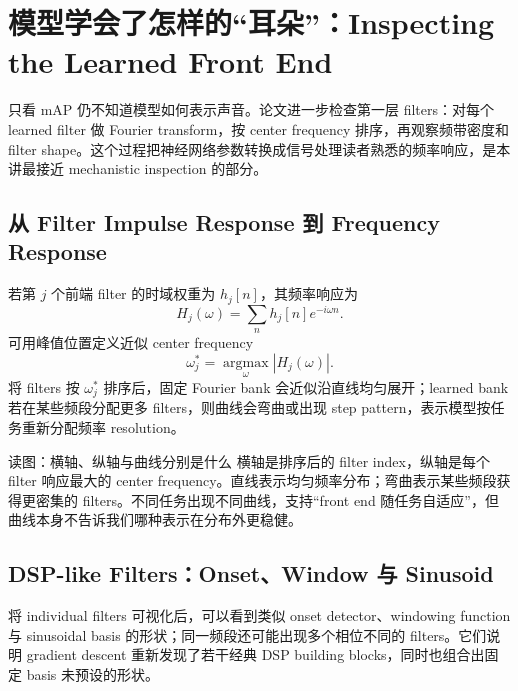 \section{模型学会了怎样的“耳朵”：Inspecting the Learned Front End}

只看 mAP 仍不知道模型如何表示声音。论文进一步检查第一层 filters：对每个 learned filter 做 Fourier transform，按 center frequency 排序，再观察频带密度和 filter shape。这个过程把神经网络参数转换成信号处理读者熟悉的频率响应，是本讲最接近 mechanistic inspection 的部分。

\subsection{从 Filter Impulse Response 到 Frequency Response}

若第 $j$ 个前端 filter 的时域权重为 $h_j[n]$，其频率响应为
\[
H_j(\omega)=\sum_n h_j[n]e^{-i\omega n}.
\]
可用峰值位置定义近似 center frequency
\[
\omega_j^*=\operatorname*{argmax}_{\omega}|H_j(\omega)|.
\]
将 filters 按 $\omega_j^*$ 排序后，固定 Fourier bank 会近似沿直线均匀展开；learned bank 若在某些频段分配更多 filters，则曲线会弯曲或出现 step pattern，表示模型按任务重新分配频率 resolution。


\begin{knowledgebox}{读图：横轴、纵轴与曲线分别是什么}
横轴是排序后的 filter index，纵轴是每个 filter 响应最大的 center frequency。直线表示均匀频率分布；弯曲表示某些频段获得更密集的 filters。不同任务出现不同曲线，支持“front end 随任务自适应”，但曲线本身不告诉我们哪种表示在分布外更稳健。
\end{knowledgebox}


\subsection{DSP-like Filters：Onset、Window 与 Sinusoid}

将 individual filters 可视化后，可以看到类似 onset detector、windowing function 与 sinusoidal basis 的形状；同一频段还可能出现多个相位不同的 filters。它们说明 gradient descent 重新发现了若干经典 DSP building blocks，同时也组合出固定 basis 未预设的形状。

